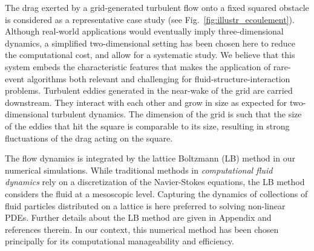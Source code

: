 \documentclass[pre,aps,floatfix,10pt,superscriptaddress, notitlepage,preprint]{revtex4-1}
\begin{document}
%
The drag exerted by a grid-generated turbulent flow onto a fixed squared obstacle is considered as a representative case study (see Fig.~\ref{fig:illustr_ecoulement}). 
%
Although real-world applications would eventually imply three-dimensional dynamics, a simplified two-dimensional setting has been chosen here to reduce the computational cost, and allow for a systematic study. 
% 
We believe that this system embeds the characteristic features that makes the application of rare-event algorithms both relevant and challenging for fluid-structure-interaction problems. 
%
Turbulent eddies generated in the near-wake of the grid are carried downstream.
They interact with each other and grow in size as expected for two-dimensional turbulent dynamics. 
The dimension of the grid is such that the size of the eddies that hit the square is comparable to its size, resulting in strong fluctuations of the drag acting on the square. 
%
%
%

%
The flow dynamics is integrated by the lattice Boltzmann (LB) method in our numerical simulations. 
While traditional methods in \emph{computational fluid dynamics} rely on a discretization of the Navier-Stokes equations, the LB method considers the fluid at a mesoscopic level. Capturing the dynamics of collections of fluid particles distributed on a lattice is here preferred to solving non-linear PDEs. 
Further details about the LB method are given in Appendix and references therein.
In our context, this numerical method has been chosen principally for its computational manageability and efficiency. 
\end{document}
